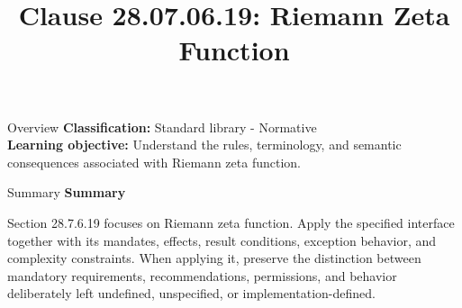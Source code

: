 \documentclass[10pt,letterpaper]{article}
\title{Clause 28.07.06.19: Riemann Zeta Function}
\author{}
\date{}
\begin{document}
\maketitle
\begin{CornellOverviewBox}{Overview}
\textbf{Classification:} Standard library - Normative\\[2pt]
\textbf{Learning objective:} Understand the rules, terminology, and semantic consequences associated with Riemann zeta function.
\end{CornellOverviewBox}\begin{CornellSummaryBox}{Summary}
{\sffamily\bfseries\color{Accent} Summary}\par\vspace{3pt}Section 28.7.6.19 focuses on Riemann zeta function. Apply the specified interface together with its mandates, effects, result conditions, exception behavior, and complexity constraints. When applying it, preserve the distinction between mandatory requirements, recommendations, permissions, and behavior deliberately left undefined, unspecified, or implementation-defined.
\end{CornellSummaryBox}
\end{document}
